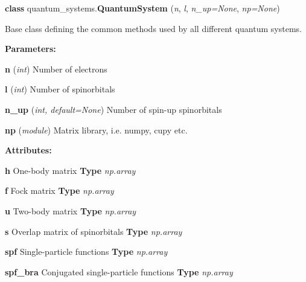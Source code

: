 \begin{tcolorbox}
    {\selectfont
    \textbf{class} quantum\_systems.\textbf{QuantumSystem}
    (\emph{n}, \emph{l}, \emph{n\_up=None}, \emph{np=None})

    \vspace{1em}
    Base class defining the common methods used by all different quantum systems.

    \vspace{1em}
    \textbf{Parameters:} 

    \hspace{2em} \textbf{n} (\emph{int}) Number of electrons
    
    \hspace{2em} \textbf{l} (\emph{int}) Number of spinorbitals

    \hspace{2em} \textbf{n\_up} (\emph{int, default=None}) Number of spin-up spinorbitals

    \hspace{2em} \textbf{np} (\emph{module}) Matrix library, i.e. numpy, cupy etc.

    \vspace{1em}
    \textbf{Attributes:}

    \hspace{2em} \textbf{h}
    One-body matrix 
    \textbf{Type} \emph{np.array}
    
    \hspace{2em} \textbf{f}
    Fock matrix
    \textbf{Type} \emph{np.array}

    \hspace{2em} \textbf{u}
    Two-body matrix
    \textbf{Type} \emph{np.array}

    \hspace{2em} \textbf{s}
    Overlap matrix of spinorbitals
    \textbf{Type} \emph{np.array}
    
    \hspace{2em} \textbf{spf}
    Single-particle functions
    \textbf{Type} \emph{np.array}

    \hspace{2em} \textbf{spf\_bra}
    Conjugated single-particle functions
    \textbf{Type} \emph{np.array}



}
\end{tcolorbox}
